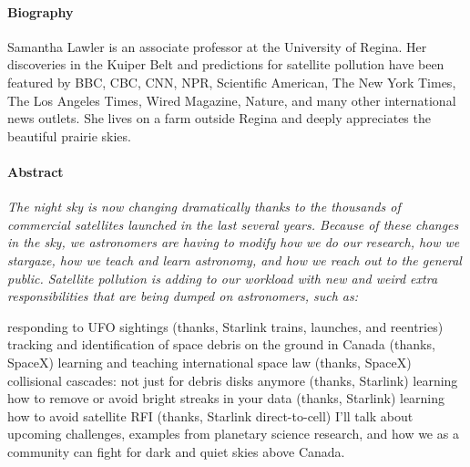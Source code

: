 \paragraph{Biography}
{\sffamily
Samantha Lawler is an associate professor at the University of Regina. Her discoveries in the Kuiper Belt and predictions for satellite pollution have been featured by BBC, CBC, CNN, NPR, Scientific American, The New York Times, The Los Angeles Times, Wired Magazine, Nature, and many other international news outlets. She lives on a farm outside Regina and deeply appreciates the beautiful prairie skies.
}

\paragraph{Abstract}
{\itshape
The night sky is now changing dramatically thanks to the thousands of commercial satellites launched in the last several years. Because of these changes in the sky, we astronomers are having to modify how we do our research, how we stargaze, how we teach and learn astronomy, and how we reach out to the general public. Satellite pollution is adding to our workload with new and weird extra responsibilities that are being dumped on astronomers, such as:

responding to UFO sightings (thanks, Starlink trains, launches, and reentries)
tracking and identification of space debris on the ground in Canada (thanks, SpaceX)
learning and teaching international space law (thanks, SpaceX)
collisional cascades: not just for debris disks anymore (thanks, Starlink)
learning how to remove or avoid bright streaks in your data (thanks, Starlink)
learning how to avoid satellite RFI (thanks, Starlink direct-to-cell)
I'll talk about upcoming challenges, examples from planetary science research, and how we as a community can fight for dark and quiet skies above Canada.
}


